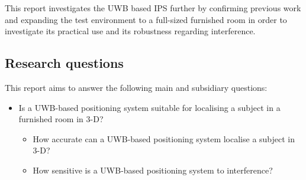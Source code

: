 This report investigates the UWB based IPS further by confirming previous work and expanding the test environment to a full-sized furnished room in order to investigate its practical use and its robustness regarding interference.

\subsection{Research questions}
This report aims to answer the following main and subsidiary questions:
\begin{itemize}	
	\item Is a UWB-based positioning system suitable for localising a subject in a furnished room in 3-D?
	\begin{itemize}
		\item How accurate can a UWB-based positioning system localise a subject in 3-D?
		\item How sensitive is a UWB-based positioning system to interference?
	\end{itemize}
\end{itemize}


\clearpage